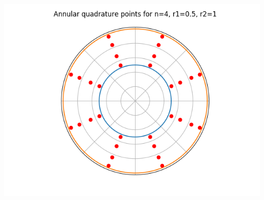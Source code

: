 \documentclass[10pt,a4paper]{letter}
\begin{document}
\includegraphics[scale=.5]{annulus_n4}
\end{document}
